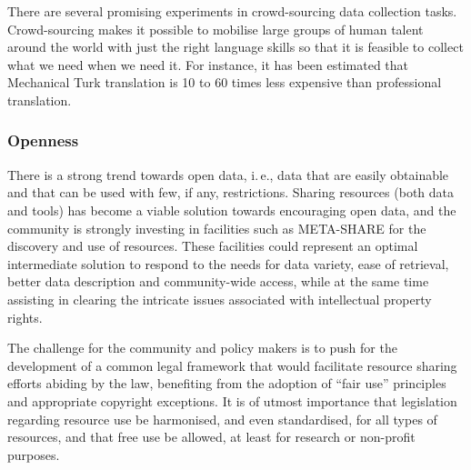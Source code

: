 \documentclass[10pt, plain]{../../metanetpaper}
\begin{document}
\begin{multicols}{2}
There are several promising experiments in crowd-sourcing data collection tasks. Crowd-sourcing makes it possible to mobilise large groups of human talent around the world with just the right language skills so that it is feasible to collect what we need when we need it. For instance, it has been estimated that Mechanical Turk translation is 10 to 60 times less expensive than professional translation. 


\subsubsection{Openness}
\label{sec:openness}

There is a strong trend towards open data, i.\,e., data that are easily obtainable and that can be used with few, if any, restrictions. Sharing resources (both data and tools) has become a viable solution towards encouraging open data, and the community is strongly investing in facilities such as META-SHARE for the discovery and use of resources. These facilities could represent an optimal intermediate solution to respond to the needs for data variety, ease of retrieval, better data description and community-wide access, while at the same time assisting in clearing the intricate issues associated with intellectual property rights.

The challenge for the community and policy makers is to push for the development of a common legal framework that would facilitate resource sharing efforts abiding by the law, benefiting from the adoption of “fair use” principles and appropriate copyright exceptions. It is of utmost importance that legislation regarding resource use be harmonised, and even standardised, for all types of resources, and that free use be allowed, at least for research or non-profit purposes. 



\end{multicols}
\end{document}
